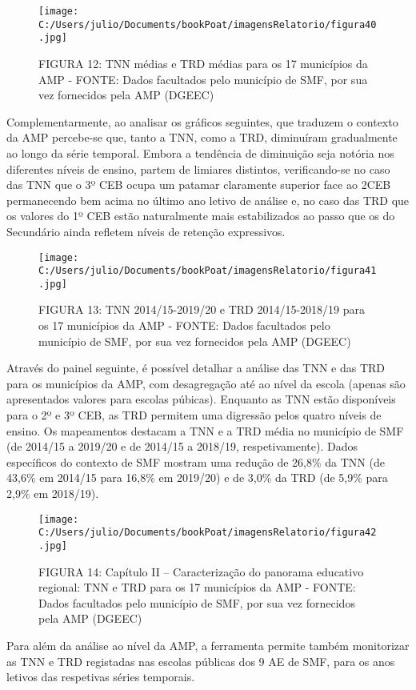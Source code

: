 \documentclass[
]{book}
\begin{document}
\begin{figure}
\centering
\texttt{[image: C:/Users/julio/Documents/bookPoat/imagensRelatorio/figura40.jpg]}
\caption{FIGURA 12: TNN médias e TRD médias para os 17 municípios da AMP - FONTE: Dados facultados pelo município de SMF, por sua vez fornecidos pela AMP (DGEEC)}
\end{figure}

Complementarmente, ao analisar os gráficos seguintes, que traduzem o contexto da AMP percebe-se que, tanto a TNN, como a TRD, diminuíram gradualmente ao longo da série temporal. Embora a tendência de diminuição seja notória nos diferentes níveis de ensino, partem de limiares distintos, verificando-se no caso das TNN que o 3º CEB ocupa um patamar claramente superior face ao 2CEB permanecendo bem acima no último ano letivo de análise e, no caso das TRD que os valores do 1º CEB estão naturalmente mais estabilizados ao passo que os do Secundário ainda refletem níveis de retenção expressivos.

\begin{figure}
\centering
\texttt{[image: C:/Users/julio/Documents/bookPoat/imagensRelatorio/figura41.jpg]}
\caption{FIGURA 13: TNN 2014/15-2019/20 e TRD 2014/15-2018/19 para os 17 municípios da AMP - FONTE: Dados facultados pelo município de SMF, por sua vez fornecidos pela AMP (DGEEC)}
\end{figure}

Através do painel seguinte, é possível detalhar a análise das TNN e das TRD para os municípios da AMP, com desagregação até ao nível da escola (apenas são apresentados valores para escolas púbicas). Enquanto as TNN estão disponíveis para o 2º e 3º CEB, as TRD permitem uma digressão pelos quatro níveis de ensino. Os mapeamentos destacam a TNN e a TRD média no município de SMF (de 2014/15 a 2019/20 e de 2014/15 a 2018/19, respetivamente). Dados específicos do contexto de SMF mostram uma redução de 26,8\% da TNN (de 43,6\% em 2014/15 para 16,8\% em 2019/20) e de 3,0\% da TRD (de 5,9\% para 2,9\% em 2018/19).

\begin{figure}
\centering
\texttt{[image: C:/Users/julio/Documents/bookPoat/imagensRelatorio/figura42.jpg]}
\caption{FIGURA 14: Capítulo II -- Caracterização do panorama educativo regional: TNN e TRD para os 17 municípios da AMP - FONTE: Dados facultados pelo município de SMF, por sua vez fornecidos pela AMP (DGEEC)}
\end{figure}

Para além da análise ao nível da AMP, a ferramenta permite também monitorizar as TNN e TRD registadas nas escolas públicas dos 9 AE de SMF, para os anos letivos das respetivas séries temporais.
\end{document}
